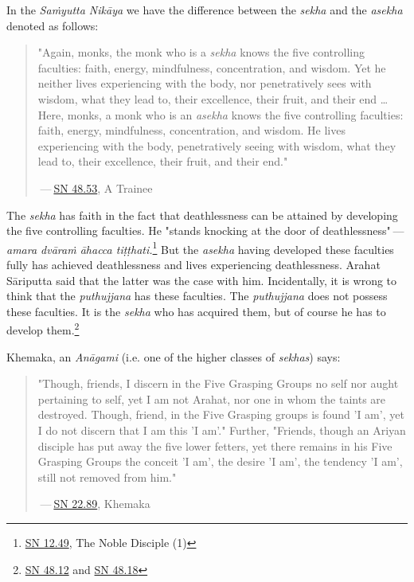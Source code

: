 In the \emph{Saṁyutta Nikāya} we have the difference between the \emph{sekha}
and the \emph{asekha} denoted as follows:


\begin{quotation}
"Again, monks, the monk who is a \emph{sekha} knows the five controlling
faculties: faith, energy, mindfulness, concentration, and wisdom. Yet he
neither lives experiencing with the body, nor penetratively sees with
wisdom, what they lead to, their excellence, their fruit, and their end
…​ Here, monks, a monk who is an \emph{asekha} knows the five controlling
faculties: faith, energy, mindfulness, concentration, and wisdom. He
lives experiencing with the body, penetratively seeing with wisdom, what
they lead to, their excellence, their fruit, and their
end."


 — \href{https://suttacentral.net/sn48.53/en/sujato}{SN 48.53}, A Trainee


\end{quotation}

The \emph{sekha} has faith in the fact that deathlessness can be attained by
developing the five controlling faculties. He "stands knocking at the
door of deathlessness" — \emph{amara dvāraṁ āhacca tiṭṭhati.}\footnote{\href{https://suttacentral.net/sn12.49/en/bodhi}{SN 12.49}, The Noble Disciple (1)}
But the \emph{asekha} having developed these faculties
fully has achieved deathlessness and lives experiencing deathlessness.
Arahat Sāriputta said that the latter was the case with him.
Incidentally, it is wrong to think that the \emph{puthujjana} has these
faculties. The \emph{puthujjana} does not possess these faculties. It is the
\emph{sekha} who has acquired them, but of course he has to develop
them.\footnote{\href{https://suttacentral.net/sn48.12/en/sujato}{SN 48.12} and \href{https://suttacentral.net/sn48.18/en/sujato}{SN 48.18}}


Khemaka, an \emph{Anāgami} (i.e. one of the higher classes of \emph{sekhas}) says:


\begin{quotation}
"Though, friends, I discern in the Five Grasping Groups no self
nor aught pertaining to self, yet I am not Arahat, nor one in whom the
taints are destroyed. Though, friend, in the Five Grasping groups is
found 'I am', yet I do not discern that I am this 'I am'." Further,
"Friends, though an Ariyan disciple has put away the five lower fetters,
yet there remains in his Five Grasping Groups the conceit 'I am', the
desire 'I am', the tendency 'I am', still not removed from him."


 — \href{https://suttacentral.net/sn22.89/en/bodhi}{SN 22.89}, Khemaka


\end{quotation}

